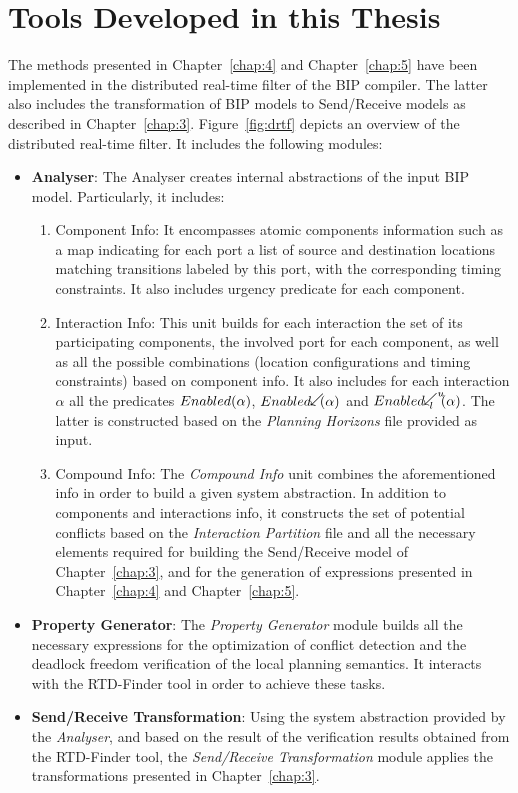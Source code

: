 \section{Tools Developed in this Thesis}
The methods presented in Chapter~\ref{chap:4} and Chapter~\ref{chap:5} have been implemented 
in the distributed real-time filter of the BIP compiler. The latter also includes
the transformation of BIP models to Send/Receive models as described in Chapter~\ref{chap:3}.
Figure~\ref{fig:drtf} depicts an overview of the distributed real-time filter. It includes the
following modules: 
\begin{itemize}
  \item \textbf{Analyser}: The Analyser creates internal abstractions of the input BIP
    model. Particularly, it includes:
    \begin{enumerate}
      \item Component Info: It encompasses atomic components information such as a map
        indicating for each port a list of source and destination locations matching transitions
        labeled by this port, with the corresponding timing constraints. 
        It also includes urgency predicate for each component.
      \item Interaction Info: This unit builds for each interaction the set of its participating
        components, the involved port for each component, as well as all the possible 
        combinations (location configurations and timing constraints) based on component info.
        It also includes for each interaction $\alpha$ all the predicates $Enabled(\alpha)$,
        $\enabledbackward{\alpha}$ and $\enabledbackwardb{\alpha}{l}{u}$. The latter is 
        constructed based on the \emph{Planning Horizons} file provided as input.
      \item Compound Info: The \emph{Compound Info} unit combines the aforementioned info in
        order to build a given system abstraction. In addition to components and interactions 
        info, it constructs the set of potential conflicts based on the \emph{Interaction 
        Partition} file and all the necessary elements required for building the Send/Receive
        model of Chapter~\ref{chap:3}, and for the generation of expressions presented in 
        Chapter~\ref{chap:4} and Chapter~\ref{chap:5}. 
    \end{enumerate}
  \item \textbf{Property Generator}: The \emph{Property Generator} module builds all the 
    necessary expressions for the optimization of conflict detection and the deadlock freedom
    verification of the local planning semantics.
    It interacts with the RTD-Finder tool in order to achieve these tasks. 
  \item \textbf{Send/Receive Transformation}: Using the system abstraction provided by 
    the \emph{Analyser}, and based on the result of the verification results obtained
    from the RTD-Finder tool, the \emph{Send/Receive Transformation} module applies the 
    transformations presented in Chapter~\ref{chap:3}. 
\end{itemize}


